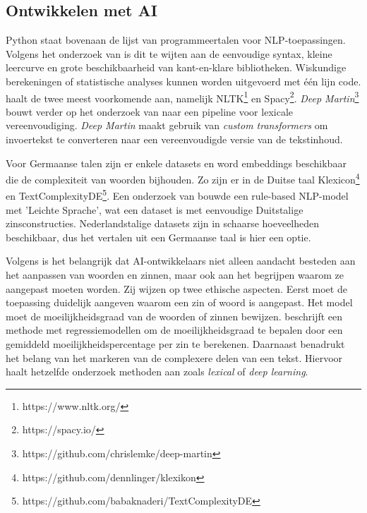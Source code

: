 

\subsection{Ontwikkelen met AI}

Python staat bovenaan de lijst van programmeertalen voor NLP-toepassingen. Volgens het onderzoek van \textcite{Thangarajah2019} is dit te wijten aan de eenvoudige syntax, kleine leercurve en grote beschikbaarheid van kant-en-klare bibliotheken. Wiskundige berekeningen of statistische analyses kunnen worden uitgevoerd met één lijn code. \textcite{Malik2022} haalt de twee meest voorkomende aan, namelijk NLTK\footnote{https://www.nltk.org/} en Spacy\footnote{https://spacy.io/}. \textit{Deep Martin}\footnote{https://github.com/chrislemke/deep-martin} bouwt verder op het onderzoek van \textcite{Shardlow2014} naar een pipeline voor lexicale vereenvoudiging. \textit{Deep Martin} maakt gebruik van \textit{custom transformers} om invoertekst te converteren naar een vereenvoudigde versie van de tekstinhoud.

Voor Germaanse talen zijn er enkele datasets en word embeddings beschikbaar die de complexiteit van woorden bijhouden. Zo zijn er in de Duitse taal Klexicon\footnote{https://github.com/dennlinger/klexikon} en TextComplexityDE\footnote{https://github.com/babaknaderi/TextComplexityDE}. Een onderzoek van \textcite{Suter2016} bouwde een rule-based NLP-model met 'Leichte Sprache', wat een dataset is met eenvoudige Duitstalige zinsconstructies. Nederlandstalige datasets zijn in schaarse hoeveelheden beschikbaar, dus het vertalen uit een Germaanse taal is hier een optie.

Volgens \textcite{Garbacea2021} is het belangrijk dat AI-ontwikkelaars niet alleen aandacht besteden aan het aanpassen van woorden en zinnen, maar ook aan het begrijpen waarom ze aangepast moeten worden. Zij wijzen op twee ethische aspecten. Eerst moet de toepassing duidelijk aangeven waarom een zin of woord is aangepast. Het model moet de moeilijkheidsgraad van de woorden of zinnen bewijzen. \textcite{Iavarone2021} beschrijft een methode met regressiemodellen om de moeilijkheidsgraad te bepalen door een gemiddeld moeilijkheidspercentage per zin te berekenen. Daarnaast benadrukt \textcite{Garbacea2021} het belang van het markeren van de complexere delen van een tekst. Hiervoor haalt hetzelfde onderzoek methoden aan zoals \textit{lexical} of \textit{deep learning}.

